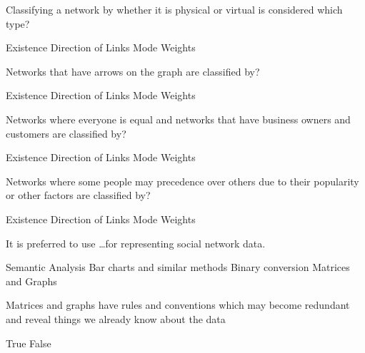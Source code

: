 \documentclass[theme=sleek, randomorder, hidesidemenu]{webquiz}
\begin{document}
\begin{question}
  Classifying a network by whether it is physical or virtual is considered which type?
  \begin{choice}
    \correct Existence
    \incorrect Direction of Links
    \incorrect Mode
    \incorrect Weights
  \end{choice}
\end{question}

\begin{question}
  Networks that have arrows on the graph are classified by?
  \begin{choice}
    \incorrect Existence
    \correct Direction of Links
    \incorrect Mode
    \incorrect Weights
  \end{choice}
\end{question}

\begin{question}
  Networks where everyone is equal and networks that have business owners and customers are classified by?
  \begin{choice}
    \incorrect Existence
    \incorrect Direction of Links
    \correct Mode
    \incorrect Weights
  \end{choice}
\end{question}

\begin{question}
  Networks where some people may precedence over others due to their popularity or other factors are classified by?
  \begin{choice}
    \incorrect Existence
    \incorrect Direction of Links
    \incorrect Mode
    \correct Weights
  \end{choice}
\end{question}

\begin{question}
  It is preferred to use \ldots for representing social network data.
  \begin{choice}
    \incorrect Semantic Analysis
    \incorrect Bar charts and similar methods
    \incorrect Binary conversion
    \correct Matrices and Graphs
  \end{choice}
\end{question}

\begin{question}
  Matrices and graphs have rules and conventions which may become redundant and reveal things we already know about the data
  \begin{choice}
    \incorrect True
    \correct False
  \end{choice}
\end{question}
\end{document}
